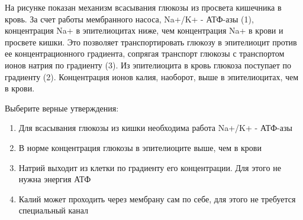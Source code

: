 
На рисунке показан механизм
всасывания глюкозы из просвета кишечника в кровь. За счет работы мембранного
насоса,  Na+/K+ -
АТФ-азы (1), концентрация Na+ в эпителиоцитах ниже, чем концентрация
Na+  в крови и просвете кишки.
Это позволяет транспортировать глюкозу в эпителиоцит против ее
концентрационного градиента, сопрягая транспорт глюкозы с транспортом ионов
натрия по градиенту (3). Из эпителиоцита в кровь глюкоза поступает по градиенту
(2). Концентрация ионов калия, наоборот, выше в эпителиоцитах, чем в крови.
 

Выберите верные утверждения:

\begin{enumerate}
    \item Для всасывания глюкозы из кишки необходима работа Na+/K+ - АТФ-азы
    \item В норме концентрация глюкозы в эпителиоците выше, чем в крови
    \item Натрий выходит из клетки по градиенту его концентрации. Для этого не нужна энергия АТФ
    \item Калий может проходить через мембрану сам по себе, для этого не требуется специальный канал
\end{enumerate}

